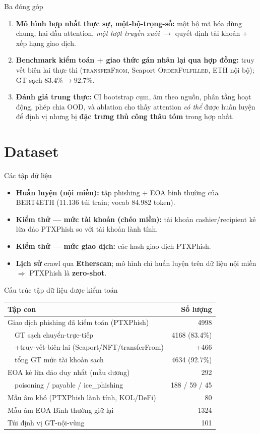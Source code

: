 \documentclass[aspectratio=169,10pt]{beamer}
\begin{document}
\begin{frame}{Ba đóng góp}
\begin{enumerate}
\item \textbf{Mô hình hợp nhất thực sự, một-bộ-trọng-số:} một bộ mã hóa dùng chung, hai đầu attention, \emph{một lượt truyền xuôi} $\to$ quyết định tài khoản + xếp hạng giao dịch.
\item \textbf{Benchmark kiểm toán + giao thức gán nhãn lại qua hợp đồng:} truy vết biên lai thực thi (\textsc{transferFrom}, Seaport \textsc{OrderFulfilled}, ETH nội bộ); GT sạch $83.4\% \to 92.7\%$.
\item \textbf{Đánh giá trung thực:} CI bootstrap cụm, âm theo nguồn, phân tầng hoạt động, phép chia OOD, và ablation cho thấy attention \emph{có thể} được huấn luyện để định vị nhưng bị \textbf{đặc trưng thủ công thâu tóm} trong hợp nhất.
\end{enumerate}
\end{frame}

\section{Dataset}
\begin{frame}{Các tập dữ liệu}
\begin{itemize}
\item \textbf{Huấn luyện (nội miền):} tập phishing + EOA bình thường của BERT4ETH (11.136 túi train; vocab 84.982 token).
\item \textbf{Kiểm thử --- mức tài khoản (chéo miền):} tài khoản cashier/recipient kẻ lừa đảo PTXPhish so với tài khoản lành tính.
\item \textbf{Kiểm thử --- mức giao dịch:} các hash giao dịch PTXPhish.
\item \textbf{Lịch sử} crawl qua \textbf{Etherscan}; mô hình chỉ huấn luyện trên dữ liệu nội miền $\Rightarrow$ PTXPhish là \textbf{zero-shot}.
\end{itemize}
\end{frame}

\begin{frame}{Cấu trúc tập dữ liệu được kiểm toán}
\centering\small
\begin{tabular}{lr}\toprule
\textbf{Tập con} & \textbf{Số lượng}\\\midrule
Giao dịch phishing đã kiểm toán (PTXPhish) & 4998\\
\ \ GT sạch chuyển-trực-tiếp & 4168 (83.4\%)\\
\ \ +truy-vết-biên-lai (Seaport/NFT/transferFrom) & +466\\
\ \ tổng GT mức tài khoản sạch & 4634 (92.7\%)\\
EOA kẻ lừa đảo duy nhất (mẫu dương) & 292\\
\ \ poisoning / payable / ice\_phishing & 188 / 59 / 45\\
Mẫu âm khó (PTXPhish lành tính, KOL/DeFi) & 80\\
Mẫu âm EOA Bình thường giữ lại & 1324\\
Túi định vị GT-nội-vùng & 101\\\bottomrule
\end{tabular}
\end{frame}
\end{document}
